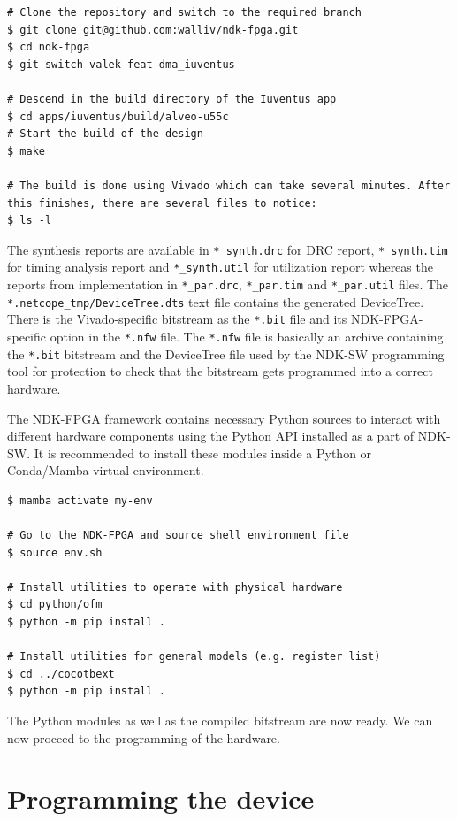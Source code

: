\begin{lstlisting}[caption={Building the NDK-FPGA design}]
# Clone the repository and switch to the required branch
$ git clone git@github.com:walliv/ndk-fpga.git
$ cd ndk-fpga
$ git switch valek-feat-dma_iuventus

# Descend in the build directory of the Iuventus app
$ cd apps/iuventus/build/alveo-u55c
# Start the build of the design
$ make

# The build is done using Vivado which can take several minutes. After this finishes, there are several files to notice:
$ ls -l
\end{lstlisting}

The synthesis reports are available in \verb|*_synth.drc| for \ac{DRC} report, \verb|*_synth.tim|
for timing analysis report and \verb|*_synth.util| for utilization report whereas the reports from
implementation in \verb|*_par.drc|, \verb|*_par.tim| and \verb|*_par.util| files. The
\verb|*.netcope_tmp/DeviceTree.dts| text file contains the generated DeviceTree. There is the Vivado-specific
bitstream as the \verb|*.bit| file and its NDK-FPGA-specific option in the \verb|*.nfw| file. The
\verb|*.nfw| file is basically an archive containing the \verb|*.bit| bitstream and the DeviceTree
file used by the NDK-SW programming tool for protection to check that the bitstream gets programmed
into a correct hardware.

The NDK-FPGA framework contains necessary Python sources to interact with different hardware
components using the Python API installed as a part of NDK-SW. It is recommended to install these
modules inside a Python or Conda/Mamba virtual environment.

\begin{lstlisting}[caption={Installing NDK-FPGA Python modules}]
$ mamba activate my-env

# Go to the NDK-FPGA and source shell environment file
$ source env.sh

# Install utilities to operate with physical hardware
$ cd python/ofm
$ python -m pip install .

# Install utilities for general models (e.g. register list)
$ cd ../cocotbext
$ python -m pip install .
\end{lstlisting}

 The Python modules as well as the compiled bitstream are now ready. We can now proceed to the
 programming of the hardware.

\section{Programming the device}

